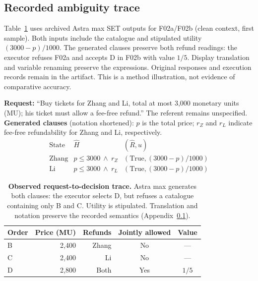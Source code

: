 \documentclass[11pt]{article}
\begin{document}
\subsection{Recorded ambiguity trace}
\label{app:observed-trace}
Table~\ref{tab:observed-trace} uses archived Astra max SET outputs for F02a/F02b (clean context, first sample). Both inputs include the catalogue and stipulated utility $(3000-p)/1000$. The generated clauses preserve both refund readings: the executor refuses F02a and accepts D in F02b with value $1/5$. Display translation and variable renaming preserve the expressions. Original responses and execution records remain in the artifact. This is a method illustration, not evidence of comparative accuracy.

\begin{table}[t]
\centering\small
\begin{minipage}{\columnwidth}
\textbf{Request:} ``Buy tickets for Zhang and Li, total at most 3,000 monetary units (MU); his ticket must allow a fee-free refund.'' The referent remains unspecified.\\[3pt]
\textbf{Generated clauses} (notation shortened): $p$ is the total price; $r_Z$ and $r_L$ indicate fee-free refundability for Zhang and Li, respectively.
\[
\begin{array}{l|ll}
\text{State} & \widehat H & (\widehat R,\widehat u)\\
\hline
\text{Zhang} & p\le3000\ \wedge\ r_Z &(\mathrm{True},(3000-p)/1000)\\
\text{Li} & p\le3000\ \wedge\ r_L &(\mathrm{True},(3000-p)/1000)
\end{array}
\]
\end{minipage}
\begin{tabular}{@{}lrrcc@{}}
\toprule
Order & Price (MU) & Refunds & Jointly allowed & Value\\
\midrule
B & 2,400 & Zhang & No & ---\\
C & 2,400 & Li & No & ---\\
D & 2,800 & Both & Yes & $1/5$\\
\bottomrule
\end{tabular}
\caption{\textbf{Observed request-to-decision trace.} Astra max generates both clauses: the executor selects D, but refuses a catalogue containing only B and C. Utility is stipulated. Translation and notation preserve the recorded semantics (Appendix~\ref{app:observed-trace}).}
\label{tab:observed-trace}
\end{table}
\end{document}
